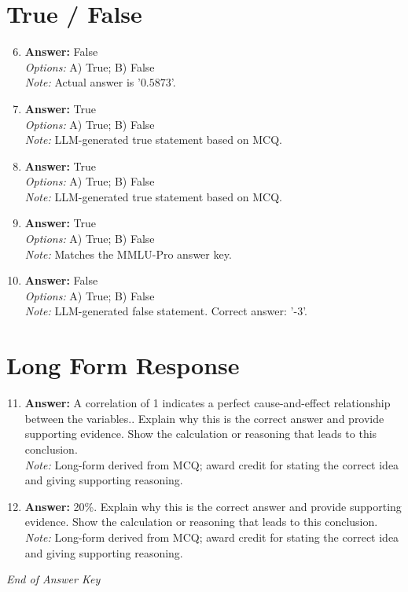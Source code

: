 \documentclass[12pt]{article}
\begin{document}
\section*{True / False}
\begin{enumerate}[label=\arabic*.]
\setcounter{enumi}{5}
\item \textbf{Answer:} False
\\ \textit{Options:} A) True; B) False
\\ \textit{Note:} Actual answer is '$0.5873$'.
\item \textbf{Answer:} True
\\ \textit{Options:} A) True; B) False
\\ \textit{Note:} LLM-generated true statement based on MCQ.
\item \textbf{Answer:} True
\\ \textit{Options:} A) True; B) False
\\ \textit{Note:} LLM-generated true statement based on MCQ.
\item \textbf{Answer:} True
\\ \textit{Options:} A) True; B) False
\\ \textit{Note:} Matches the MMLU-Pro answer key.
\item \textbf{Answer:} False
\\ \textit{Options:} A) True; B) False
\\ \textit{Note:} LLM-generated false statement. Correct answer: '-3'.
\end{enumerate}

\section*{Long Form Response}
\begin{enumerate}[label=\arabic*.]
\setcounter{enumi}{10}
\item \textbf{Answer:} A correlation of 1 indicates a perfect cause-and-effect relationship between the variables.. Explain why this is the correct answer and provide supporting evidence. Show the calculation or reasoning that leads to this conclusion.
\\ \textit{Note:} Long-form derived from MCQ; award credit for stating the correct idea and giving supporting reasoning.
\item \textbf{Answer:} 20\%. Explain why this is the correct answer and provide supporting evidence. Show the calculation or reasoning that leads to this conclusion.
\\ \textit{Note:} Long-form derived from MCQ; award credit for stating the correct idea and giving supporting reasoning.
\end{enumerate}

\vfill
\noindent\textit{End of Answer Key}
\end{document}
